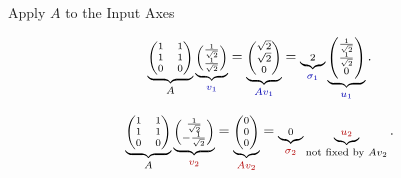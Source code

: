 \documentclass[10pt]{beamer}
\theoremstyle{definition}
\newcommand{\rd}[1]{{\color{red!70!black}#1}}
\newcommand{\bl}[1]{{\color{blue!70!black}#1}}
\begin{document}
\begin{frame}[shrink=12]{Apply $A$ to the Input Axes}

\[
\scriptsize
\underbrace{
\begin{pmatrix}
1&1\\
1&1\\
0&0
\end{pmatrix}}_{A}
\underbrace{
\begin{pmatrix}
\frac1{\sqrt2}\\[0.15em]
\frac1{\sqrt2}
\end{pmatrix}}_{\bl{v_1}}
=
\underbrace{
\begin{pmatrix}
\sqrt2\\
\sqrt2\\
0
\end{pmatrix}}_{\bl{Av_1}}
=
\underbrace{2}_{\bl{\sigma_1}}
\underbrace{
\begin{pmatrix}
\frac1{\sqrt2}\\[0.15em]
\frac1{\sqrt2}\\[0.15em]
0
\end{pmatrix}}_{\bl{u_1}}.
\]

\vfill

\[
\scriptsize
\underbrace{
\begin{pmatrix}
1&1\\
1&1\\
0&0
\end{pmatrix}}_{A}
\underbrace{
\begin{pmatrix}
\frac1{\sqrt2}\\[0.15em]
-\frac1{\sqrt2}
\end{pmatrix}}_{\rd{v_2}}
=
\underbrace{
\begin{pmatrix}
0\\
0\\
0
\end{pmatrix}}_{\rd{Av_2}}
=
\underbrace{0}_{\rd{\sigma_2}}
\underbrace{\rd{u_2}}_{\text{not fixed by }Av_2}.
\]

\end{frame}
\end{document}
